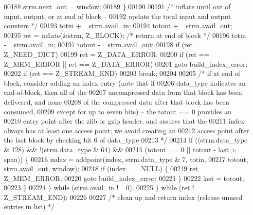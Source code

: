 \begin{DoxyCode}
00188                 strm.next\_out = window;
00189             \}
00190 
00191             \textcolor{comment}{/* inflate until out of input, output, or at end of block --}
00192 \textcolor{comment}{               update the total input and output counters */}
00193             totin += strm.avail\_in;
00194             totout += strm.avail\_out;
00195             ret = inflate(&strm, Z\_BLOCK);      \textcolor{comment}{/* return at end of block */}
00196             totin -= strm.avail\_in;
00197             totout -= strm.avail\_out;
00198             \textcolor{keywordflow}{if} (ret == Z\_NEED\_DICT)
00199                 ret = Z\_DATA\_ERROR;
00200             \textcolor{keywordflow}{if} (ret == Z\_MEM\_ERROR || ret == Z\_DATA\_ERROR)
00201                 \textcolor{keywordflow}{goto} build\_index\_error;
00202             \textcolor{keywordflow}{if} (ret == Z\_STREAM\_END)
00203                 \textcolor{keywordflow}{break};
00204 
00205             \textcolor{comment}{/* if at end of block, consider adding an index entry (note that if}
00206 \textcolor{comment}{               data\_type indicates an end-of-block, then all of the}
00207 \textcolor{comment}{               uncompressed data from that block has been delivered, and none}
00208 \textcolor{comment}{               of the compressed data after that block has been consumed,}
00209 \textcolor{comment}{               except for up to seven bits) -- the totout == 0 provides an}
00210 \textcolor{comment}{               entry point after the zlib or gzip header, and assures that the}
00211 \textcolor{comment}{               index always has at least one access point; we avoid creating an}
00212 \textcolor{comment}{               access point after the last block by checking bit 6 of data\_type}
00213 \textcolor{comment}{             */}
00214             \textcolor{keywordflow}{if} ((strm.data\_type & 128) && !(strm.data\_type & 64) &&
00215                 (totout == 0 || totout - last > span)) \{
00216                 index = addpoint(index, strm.data\_type & 7, totin,
00217                                  totout, strm.avail\_out, window);
00218                 \textcolor{keywordflow}{if} (index == NULL) \{
00219                     ret = Z\_MEM\_ERROR;
00220                     \textcolor{keywordflow}{goto} build\_index\_error;
00221                 \}
00222                 last = totout;
00223             \}
00224         \} \textcolor{keywordflow}{while} (strm.avail\_in != 0);
00225     \} \textcolor{keywordflow}{while} (ret != Z\_STREAM\_END);
00226 
00227     \textcolor{comment}{/* clean up and return index (release unused entries in list) */}

\end{DoxyCode}
